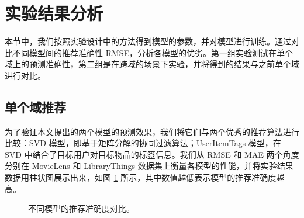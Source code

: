 \section{实验结果分析}
本节中，我们按照实验设计中的方法得到模型的参数，并对模型进行训练。通过对比不同模型间的推荐准确性 RMSE，分析各模型的优劣。第一组实验测试在单个域上的预测准确性，第二组是在跨域的场景下实验，并将得到的结果与之前单个域进行对比。

\subsection{单个域推荐}
为了验证本文提出的两个模型的预测效果，我们将它们与两个优秀的推荐算法进行比较：SVD 模型，即基于矩阵分解的协同过滤算法；UserItemTags 模型，在 SVD 中结合了目标用户对目标物品的标签信息。我们从 RMSE 和 MAE 两个角度分别在 MovieLens 和 LibraryThings 数据集上衡量各模型的性能，并将实验结果数据用柱状图展示出来，如图 \ref{fig:bar} 所示，其中数值越低表示模型的推荐准确度越高。
\begin{figure}[!htbp]
\centering
{}
\caption{不同模型的推荐准确度对比。}
\label{fig:bar}
\end{figure}


